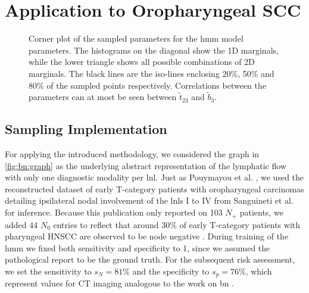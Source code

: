 \documentclass[\relativeRoot/main.tex]{subfiles}
\begin{document}
\section{Application to Oropharyngeal SCC}
\label{sec:unilateral:application}



\begin{figure}
    \centering
    \def\svgwidth{1.0\textwidth}
    
    \caption[Corner plot of the sampled parameters for the unilateral model]{Corner plot of the sampled parameters for the \gls{hmm} model parameters. The histograms on the diagonal show the 1D marginals, while the lower triangle shows all possible combinations of 2D marginals. The black lines are the iso-lines enclosing 20\%, 50\% and 80\% of the sampled points respectively. Correlations between the parameters can at most be seen between $\tilde{t}_{23}$ and $\tilde{b}_3$.}
    \label{fig:unilateral:corner_hmm}
\end{figure}

\subsection{Sampling Implementation}
\label{subsec:unilateral:application:sampling}

For applying the introduced methodology, we considered the graph in \cref{fig:bn:graph} as the underlying abstract representation of the lymphatic flow with only one diagnostic modality per \gls{lnl}. Just as Pouymayou et al. \cite{pouymayou_bayesian_2019}, we used the reconstructed dataset of early T-category patients with oropharyngeal carcinomas detailing ipsilateral nodal involvement of the \glspl{lnl} I to IV from Sanguineti et al. \cite{sanguineti_defining_2009} for inference. Because this publication only reported on 103 $N_+$ patients, we added 44 $N_0$ entries to reflect that around 30\% of early T-category patients with pharyngeal HNSCC are observed to be node negative \cite{gregoire_selection_2000}. During training of the \gls{hmm} we fixed both sensitivity and specificity to 1, since we assumed the pathological report to be the ground truth. For the subsequent risk assessment, we set the sensitivity to $s_N = 81\%$ and the specificity to $s_p = 76\%$, which represent values for CT imaging \cite{de_bondt_detection_2007} analogous to the work on \gls{bn} \cite{pouymayou_bayesian_2019}.
    
\end{document}
